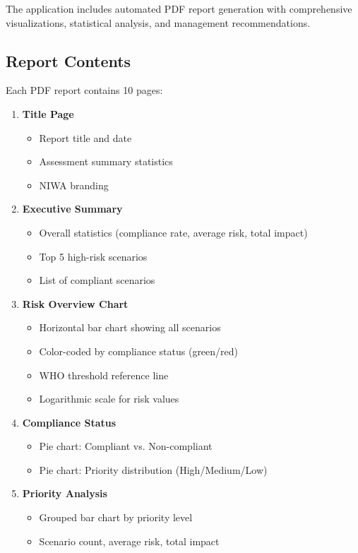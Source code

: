 \documentclass[11pt,a4paper]{article}
\begin{document}
The application includes automated PDF report generation with comprehensive visualizations, statistical analysis, and management recommendations.

\subsection{Report Contents}

Each PDF report contains 10 pages:

\begin{enumerate}[leftmargin=*]
    \item \textbf{Title Page}
    \begin{itemize}
        \item Report title and date
        \item Assessment summary statistics
        \item NIWA branding
    \end{itemize}

    \item \textbf{Executive Summary}
    \begin{itemize}
        \item Overall statistics (compliance rate, average risk, total impact)
        \item Top 5 high-risk scenarios
        \item List of compliant scenarios
    \end{itemize}

    \item \textbf{Risk Overview Chart}
    \begin{itemize}
        \item Horizontal bar chart showing all scenarios
        \item Color-coded by compliance status (green/red)
        \item WHO threshold reference line
        \item Logarithmic scale for risk values
    \end{itemize}

    \item \textbf{Compliance Status}
    \begin{itemize}
        \item Pie chart: Compliant vs. Non-compliant
        \item Pie chart: Priority distribution (High/Medium/Low)
    \end{itemize}

    \item \textbf{Priority Analysis}
    \begin{itemize}
        \item Grouped bar chart by priority level
        \item Scenario count, average risk, total impact
    \end{itemize}


\end{enumerate}
\end{document}
